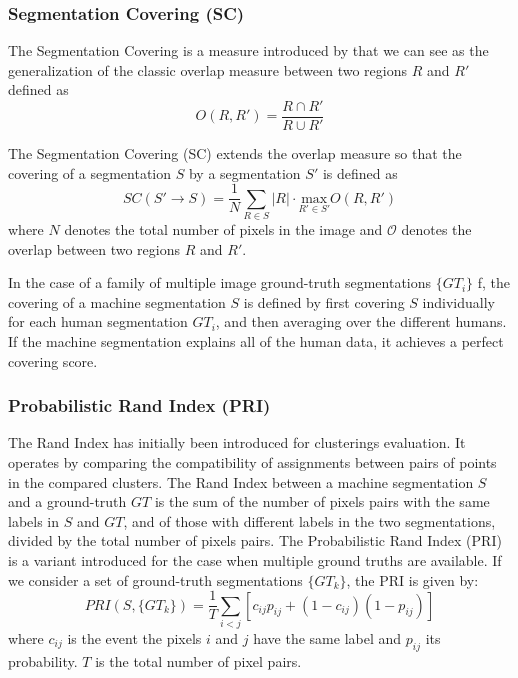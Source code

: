 \documentclass[journal]{IEEEtran}
\begin{document}
\subsubsection{Segmentation Covering (SC)}

The Segmentation Covering is a measure introduced by \cite{Arbelaez.Maire.ea:PR:2009} that we can see as the generalization of the classic overlap measure between two regions $R$ and $R'$ defined as
\begin{equation}
	O(R, R') = \frac{R \cap R'}{R \cup R'}
\end{equation}

The Segmentation Covering (SC) extends the overlap measure so that the covering of a segmentation $S$ by a segmentation $S'$ is defined as 
\begin{equation}
	SC(S' \rightarrow S) = \frac{1}{N}\sum_{R \in S} |R| \cdot \underset{R' \in S'}{\mathrm{max}} O(R, R')
\end{equation}
where $N$ denotes the total number of pixels in the image and $\mathcal{O}$ denotes the overlap between two regions $R$ and $R'$.

In the case of a family of multiple image ground-truth segmentations $\{GT_i\}$ f, the covering of a machine segmentation $S$ is defined by first covering $S$ individually for each human segmentation $GT_i$, and then averaging over the different humans. If the machine segmentation explains all of the human data, it achieves a perfect covering score.

\subsubsection{Probabilistic Rand Index (PRI)}
The Rand Index has initially been introduced for clusterings evaluation. It operates by comparing the compatibility of assignments between pairs of points in the compared clusters. The Rand Index between a machine segmentation $S$ and a ground-truth $GT$ is the sum of the number of pixels pairs with the same labels in $S$ and $GT$, and of those with different labels in the two segmentations, divided by the total number of pixels pairs. The Probabilistic Rand Index (PRI) \cite{Unnikrishnan.Pantofaru.ea:CVPR:2005} is a variant introduced for the case when multiple ground truths are available. If we consider a set of ground-truth segmentations $\{GT_k\}$, the PRI is given by:
\begin{equation}
	PRI(S, \{GT_k\}) = \frac{1}{T}\sum_{i<j} [c_{ij}p_{ij} + (1-c_{ij})(1-p_{ij})]
\end{equation}
where $c_{ij}$ is the event the pixels $i$ and $j$ have the same label and $p_{ij}$ its probability. $T$ is the total number of pixel pairs.
\end{document}
